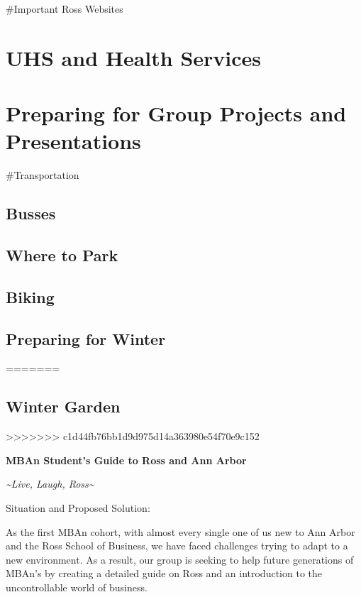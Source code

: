 \documentclass[
]{book}
\begin{document}
\#Important Ross Websites

\hypertarget{uhs-and-health-services}{%
\chapter{UHS and Health Services}\label{uhs-and-health-services}}

\hypertarget{preparing-for-group-projects-and-presentations}{%
\chapter{Preparing for Group Projects and Presentations}\label{preparing-for-group-projects-and-presentations}}

\#Transportation

\hypertarget{busses}{%
\section{Busses}\label{busses}}

\hypertarget{where-to-park}{%
\section{Where to Park}\label{where-to-park}}

\hypertarget{biking}{%
\section{Biking}\label{biking}}

\hypertarget{preparing-for-winter}{%
\section{Preparing for Winter}\label{preparing-for-winter}}
=======
\hypertarget{winter-garden}{%
\section{Winter Garden}\label{winter-garden}}
>>>>>>> c1d44fb76bb1d9d975d14a363980e54f70e9c152

\textbf{MBAn Student's Guide to Ross and Ann Arbor}

\emph{\textasciitilde Live, Laugh, Ross\textasciitilde{}}

Situation and Proposed Solution:

As the first MBAn cohort, with almost every single one of us new to Ann Arbor and the Ross School of Business, we have faced challenges trying to adapt to a new environment. As a result, our group is seeking to help future generations of MBAn's by creating a detailed guide on Ross and an introduction to the uncontrollable world of business.
\end{document}
